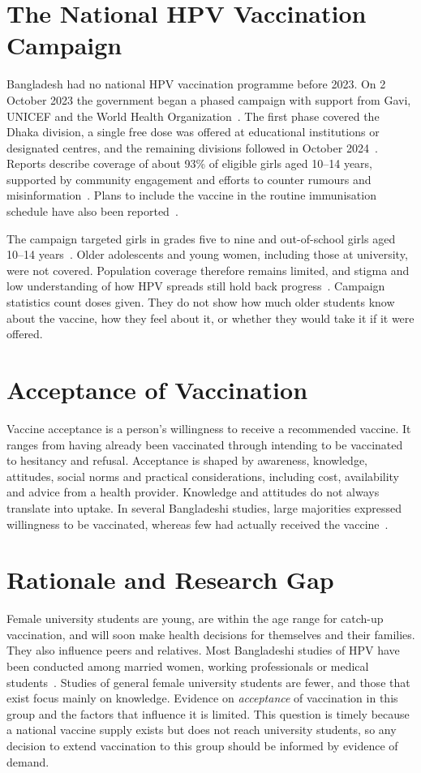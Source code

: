 \section{The National HPV Vaccination Campaign}
Bangladesh had no national HPV vaccination programme before 2023. On 2 October 2023 the government began a phased campaign with support from Gavi, UNICEF and the World Health Organization~\cite{gavi2023,unicef2023}. The first phase covered the Dhaka division, a single free dose was offered at educational institutions or designated centres, and the remaining divisions followed in October 2024~\cite{gavi2023,unbd2024}. Reports describe coverage of about 93\% of eligible girls aged 10--14 years, supported by community engagement and efforts to counter rumours and misinformation~\cite{dhakatribune2024}. Plans to include the vaccine in the routine immunisation schedule have also been reported~\cite{asianews2024}.

The campaign targeted girls in grades five to nine and out-of-school girls aged 10--14 years~\cite{dailystar2024}. Older adolescents and young women, including those at university, were not covered. Population coverage therefore remains limited, and stigma and low understanding of how HPV spreads still hold back progress~\cite{salauddin2025}. Campaign statistics count doses given. They do not show how much older students know about the vaccine, how they feel about it, or whether they would take it if it were offered.

\section{Acceptance of Vaccination}
Vaccine acceptance is a person's willingness to receive a recommended vaccine.
It ranges from having already been vaccinated through intending to be vaccinated to hesitancy and refusal.
Acceptance is shaped by awareness, knowledge, attitudes, social norms and practical considerations, including cost, availability and advice from a health provider.
Knowledge and attitudes do not always translate into uptake.
In several Bangladeshi studies, large majorities expressed willingness to be vaccinated, whereas few had actually received the vaccine~\cite{banik2022,taniya2023,chowdhury2022}.

\section{Rationale and Research Gap}
Female university students are young, are within the age range for catch-up vaccination, and will soon make health decisions for themselves and their families.
They also influence peers and relatives.
Most Bangladeshi studies of HPV have been conducted among married women, working professionals or medical students~\cite{islam2018,bhuiyan2018,chowdhury2022}.
Studies of general female university students are fewer, and those that exist focus mainly on knowledge.
Evidence on \emph{acceptance} of vaccination in this group and the factors that influence it is limited.
This question is timely because a national vaccine supply exists but does not reach university students, so any decision to extend vaccination to this group should be informed by evidence of demand.

